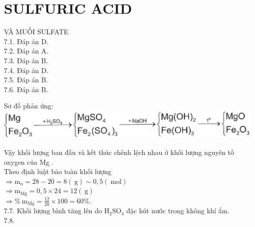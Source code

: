 \documentclass[10pt]{article}
\begin{document}
\section*{SULFURIC ACID}
VÀ MUỐI SULFATE\\
7.1. Đáp án D.\\
7.2. Đáp án A.\\
7.3. Đáp án B.\\
7.4. Đáp án D.\\
7.5. Đáp án B.\\
7.6. Đáp án B.

Sơ đồ phản ứng:\\
\includegraphics[max width=\textwidth, center]{2025_10_23_adad5b98d65ac6665838g-09}

Vậy khối lượng ban đầu và kết thúc chênh lệch nhau ở khối lượng nguyên tố oxygen của Mg .\\
Theo định luật bảo toàn khối lượng\\
$\Rightarrow \mathrm{m}_{\mathrm{o}}=28-20=8(\mathrm{~g}) \sim 0,5(\mathrm{~mol})$\\
$\Rightarrow \mathrm{m}_{\mathrm{Mg}}=0,5 \times 24=12(\mathrm{~g})$\\
$\Rightarrow \% \mathrm{~m}_{\mathrm{Mg}}=\frac{12}{20} \times 100=60 \%$.\\
7.7. Khối lượng bình tăng lên do $\mathrm{H}_{2} \mathrm{SO}_{4}$ đặc hút nước trong không khí ẩm.\\
7.8.
\end{document}
